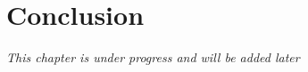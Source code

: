 
\chapter{Conclusion}

\textit{This chapter is under progress and will be added later}

\cleardoublepage